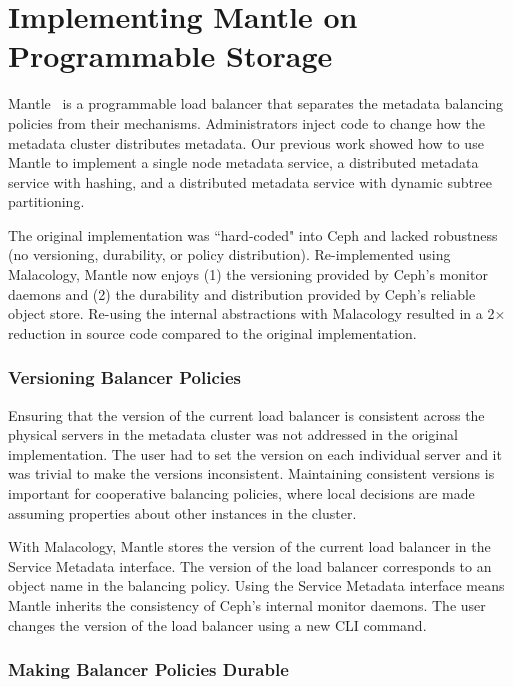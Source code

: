 \section{Implementing Mantle on Programmable Storage}
\label{sec:mantle-progstorage}

Mantle~\cite{sevilla:sc15-mantle} is a programmable load balancer that
separates the metadata balancing policies from their mechanisms. Administrators
inject code to change how the metadata cluster distributes metadata. Our
previous work showed how to use Mantle to implement a single node metadata
service, a distributed metadata service with hashing, and a distributed
metadata service with dynamic subtree partitioning. 

The original implementation was ``hard-coded" into Ceph and lacked robustness
(no versioning, durability, or policy distribution).  Re-implemented using
Malacology, Mantle now enjoys (1) the versioning provided by Ceph's monitor
daemons and (2) the durability and distribution provided by Ceph's reliable
object store.  Re-using the internal abstractions with Malacology resulted in a
2\(\times\) reduction in source code compared to the original implementation.

\subsubsection{Versioning Balancer Policies}

Ensuring that the version of the current load balancer is consistent across the
physical servers in the metadata cluster was not addressed in the original
implementation. The user had to set the version on each individual server and
it was trivial to make the versions inconsistent. Maintaining consistent
versions is important for cooperative balancing policies, where local decisions
are made assuming properties about other instances in the cluster.

With Malacology, Mantle stores the version of the current load balancer in the
Service Metadata interface. The version of the load balancer corresponds to an
object name in the balancing policy. Using the Service Metadata interface means
Mantle inherits the consistency of Ceph's internal monitor daemons. The user
changes the version of the load balancer using a new CLI command.

\subsubsection{Making Balancer Policies Durable}

